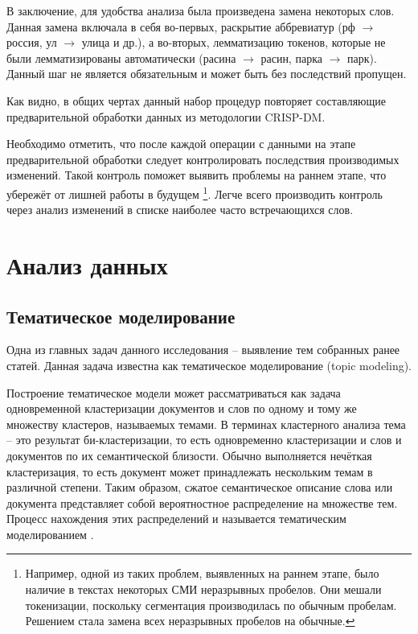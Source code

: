 В заключение, для удобства анализа была произведена замена некоторых слов. Данная замена включала в себя во-первых, раскрытие аббревиатур (рф $\to$ россия, ул $\to$ улица и др.), а во-вторых, лемматизацию токенов, которые не были лемматизированы автоматически (расина $\to$ расин, парка $\to$ парк). Данный шаг не является обязательным и может быть без последствий пропущен.

Как видно, в общих чертах данный набор процедур повторяет составляющие предварительной обработки данных из методологии CRISP-DM.

Необходимо отметить, что после каждой операции с данными на этапе предварительной обработки следует контролировать последствия производимых изменений. Такой контроль поможет выявить проблемы на раннем этапе, что убережёт от лишней работы в будущем \footnote{Например, одной из таких проблем, выявленных на раннем этапе, было наличие в текстах некоторых СМИ неразрывных пробелов. Они мешали токенизации, поскольку сегментация производилась по обычным пробелам. Решением стала замена всех неразрывных пробелов на обычные.}. Легче всего производить контроль через анализ изменений в списке наиболее часто встречающихся слов.

\section{Анализ данных}

\subsection{Тематическое моделирование}
Одна из главных задач данного исследования -- выявление тем собранных ранее статей. Данная задача известна как тематическое моделирование (topic modeling).

Построение тематическое модели может рассматриваться как задача одновременной кластеризации документов и слов по одному и тому же множеству кластеров, называемых темами. В терминах кластерного анализа тема -- это результат би-кластеризации, то есть одновременно кластеризации и слов и документов по их семантической близости. Обычно выполняется нечёткая кластеризация, то есть документ может принадлежать нескольким темам в различной степени. Таким образом, сжатое семантическое описание слова или документа представляет собой вероятностное распределение на множестве тем. Процесс нахождения этих распределений и называется тематическим моделированием \cite{korshunov2012}.



